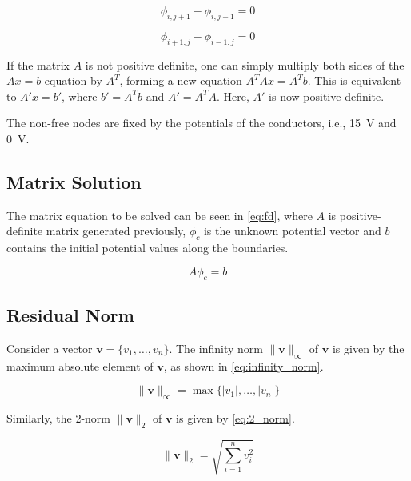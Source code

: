 \documentclass[a4paper,titlepage]{article}
\begin{document}
	\begin{equation} \label{eq:neumann_top}
		\phi_{i, j + 1} - \phi_{i, j - 1} = 0
	\end{equation}
	
	\begin{equation} \label{eq:neumann_right}
		\phi_{i + 1, j} - \phi_{i - 1, j} = 0
	\end{equation}
	
	If the matrix $A$ is not positive definite, one can simply multiply both sides of the $Ax = b$ equation by $A^T$, forming a new equation $A^TAx = A^Tb$. This is equivalent to $A'x = b'$, where $b' = A^Tb$ and $A' = A^TA$. Here, $A'$ is now positive definite.
	
	The non-free nodes are fixed by the potentials of the conductors, i.e., \SI{15}{\volt} and \SI{0}{\volt}.
	
	\subsection{Matrix Solution}
	
	The matrix equation to be solved can be seen in \cref{eq:fd}, where $A$ is positive-definite matrix generated previously, $\phi_c$ is the unknown potential vector and $b$ contains the initial potential values along the boundaries.
	
	\begin{equation} \label{eq:fd}
		A\phi_c = b
	\end{equation}
	
	\subsection{Residual Norm}
	
	Consider a vector $\textbf{v} = \{v_1, \ldots, v_n\}$. The infinity norm $\|\textbf{v}\|_\infty$ of $\textbf{v}$ is given by the maximum absolute element of $\textbf{v}$, as shown in \cref{eq:infinity_norm}.
	
	\begin{equation} \label{eq:infinity_norm}
		\|\textbf{v}\|_\infty = \max\{|v_1|, \ldots, |v_n|\}
	\end{equation}
	
	Similarly, the 2-norm $\|\textbf{v}\|_2$ of $\textbf{v}$ is given by \cref{eq:2_norm}.
	
	\begin{equation} \label{eq:2_norm}
		\|\textbf{v}\|_2 = \sqrt{\sum_{i = 1}^{n} v_i^2}
	\end{equation}
	
\end{document}
